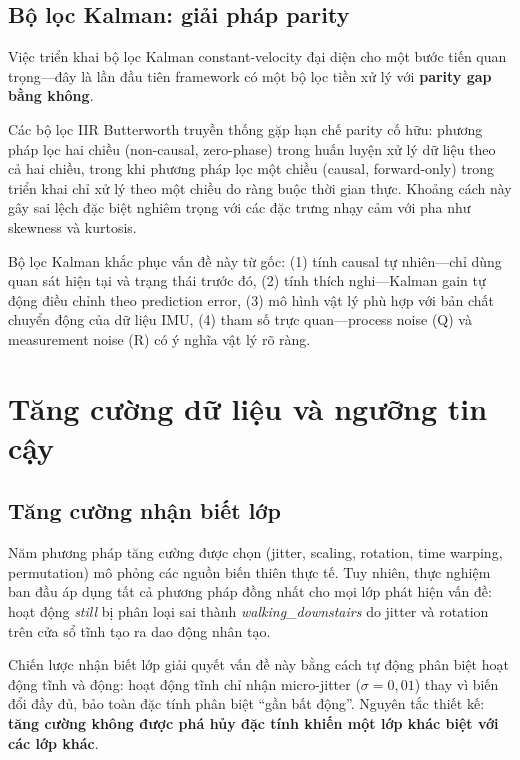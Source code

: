 \subsection{Bộ lọc Kalman: giải pháp parity}
\label{sec:disc_kalman_parity}

Việc triển khai bộ lọc Kalman constant-velocity đại diện cho một bước tiến quan trọng---đây là lần đầu tiên framework có một bộ lọc tiền xử lý với \textbf{parity gap bằng không}.

Các bộ lọc IIR Butterworth truyền thống gặp hạn chế parity cố hữu: phương pháp lọc hai chiều (non-causal, zero-phase) trong huấn luyện xử lý dữ liệu theo cả hai chiều, trong khi phương pháp lọc một chiều (causal, forward-only) trong triển khai chỉ xử lý theo một chiều do ràng buộc thời gian thực. Khoảng cách này gây sai lệch đặc biệt nghiêm trọng với các đặc trưng nhạy cảm với pha như skewness và kurtosis.

Bộ lọc Kalman khắc phục vấn đề này từ gốc: (1) tính causal tự nhiên---chỉ dùng quan sát hiện tại và trạng thái trước đó, (2) tính thích nghi---Kalman gain tự động điều chỉnh theo prediction error, (3) mô hình vật lý phù hợp với bản chất chuyển động của dữ liệu IMU, (4) tham số trực quan---process noise (Q) và measurement noise (R) có ý nghĩa vật lý rõ ràng.

\section{Tăng cường dữ liệu và ngưỡng tin cậy}

\subsection{Tăng cường nhận biết lớp}
\label{sec:augmentation_discussion}

Năm phương pháp tăng cường được chọn (jitter, scaling, rotation, time warping, permutation) mô phỏng các nguồn biến thiên thực tế. Tuy nhiên, thực nghiệm ban đầu áp dụng tất cả phương pháp đồng nhất cho mọi lớp phát hiện vấn đề: hoạt động \textit{still} bị phân loại sai thành \textit{walking\_downstairs} do jitter và rotation trên cửa sổ tĩnh tạo ra dao động nhân tạo.

Chiến lược nhận biết lớp giải quyết vấn đề này bằng cách tự động phân biệt hoạt động tĩnh và động: hoạt động tĩnh chỉ nhận micro-jitter ($\sigma = 0{,}01$) thay vì biến đổi đầy đủ, bảo toàn đặc tính phân biệt ``gần bất động''. Nguyên tắc thiết kế: \textbf{tăng cường không được phá hủy đặc tính khiến một lớp khác biệt với các lớp khác}.

